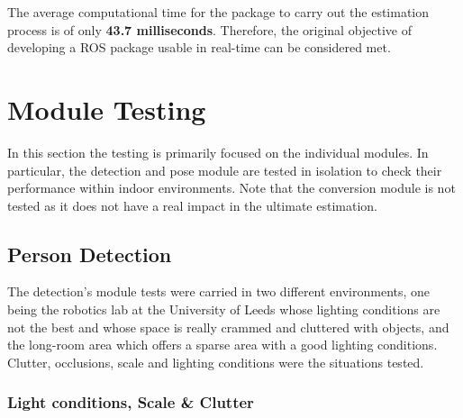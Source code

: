 The average computational time for the package to carry out the estimation process is of only \textbf{43.7 milliseconds}. Therefore, the original objective of developing a ROS package usable in real-time can be considered met.

\section{Module Testing}

In this section the testing is primarily focused on the individual modules. In particular, the detection and pose module are tested in isolation to check their performance within indoor environments. Note that the conversion module is not tested as it does not have a real impact in the ultimate estimation.

\subsection{Person Detection}

The detection's module tests were carried in two different environments, one being the robotics lab at the University of Leeds whose lighting conditions are not the best and whose space is really crammed and cluttered with objects, and the long-room area which offers a sparse area with a good lighting conditions. Clutter, occlusions, scale and lighting conditions were the situations tested.

\subsubsection{Light conditions, Scale \& Clutter}

